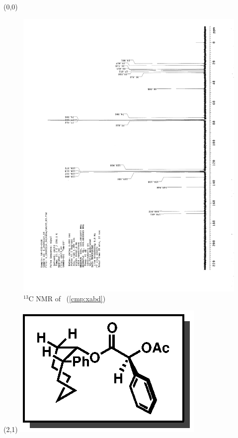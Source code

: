 \clearpage
\begin{textblock}{20}(0,0)
\begin{figure}[htb]
\caption{$^{13}$C NMR of  \CMPxabd\ (\ref{cmp:xabd})}
\includegraphics[scale=0.75, trim = 0mm 0mm 0mm 5mm,
clip]{chp_asymmetric/images/nmr/xabdC}
\vspace{-100pt}
\end{figure}
\end{textblock}
\begin{textblock}{1}(2,1)
\includegraphics[scale=0.8, angle=90]{chp_asymmetric/images/xabd}
\end{textblock}
\clearpage


